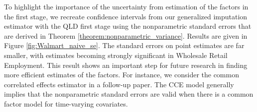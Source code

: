 \documentclass[12pt]{article}
\begin{document}
% 
% 
% 

To highlight the importance of the uncertainty from estimation of the factors in the first stage, we recreate confidence intervals from our generalized imputation estimator with the QLD first stage using the nonparametric standard errors that are derived in Theorem \ref{theorem:nonparametric_variance}. Results are given in Figure \ref{fig:Walmart_naive_se}. The standard errors on point estimates are far smaller, with estimates becoming strongly significant in Wholesale Retail Employment. This result shows an important step for future research in finding more efficient estimates of the factors. For instance, we consider the common correlated effects estimator in a follow-up paper. The CCE model generally implies that the nonparametric standard errors are valid when there is a common factor model for time-varying covariates.
\end{document}

